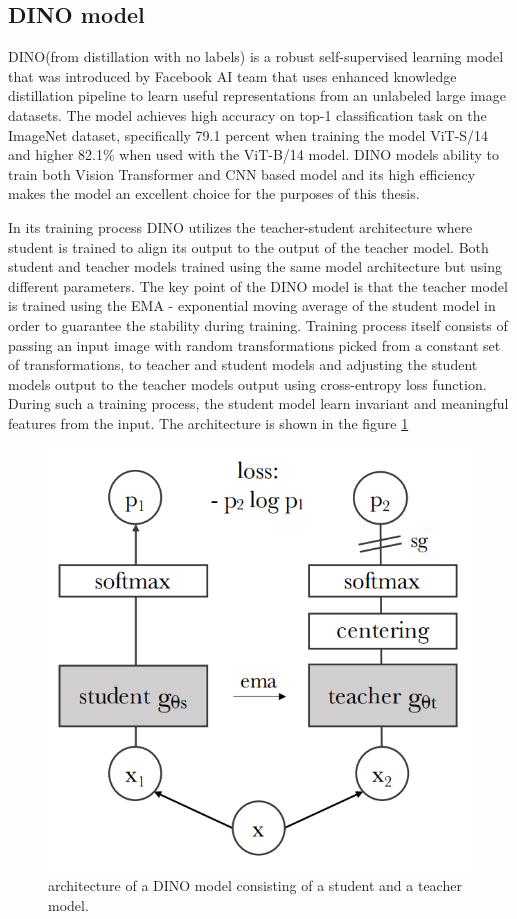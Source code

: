 \subsection{DINO model}
\label{dino}
DINO(from distillation with no labels) is a robust self-supervised learning model that was introduced by Facebook AI team that uses enhanced knowledge distillation pipeline to learn useful representations from an unlabeled large image datasets\cite{dino}. The model achieves high accuracy on top-1 classification task on the ImageNet dataset, specifically 79.1 percent when training the model ViT-S/14 and higher 82.1\% when used with the ViT-B/14 model\cite{dino}. DINO models ability to train both Vision Transformer and CNN based model and its high efficiency makes the model an excellent choice for the purposes of this thesis.

In its training process DINO utilizes the teacher-student architecture where student is trained to align its output to the output of the teacher model\cite{dino}. Both student and teacher models trained using the same model architecture but using different parameters. The key point of the DINO model is that the teacher model is trained using the EMA - exponential moving average of the student model in order to guarantee the stability during training\cite{dion}. Training process itself consists of passing an input image with random transformations picked from a constant set of transformations, to teacher and student models and adjusting the student models output to the teacher models output using cross-entropy loss function. During such a training process, the student model learn invariant and meaningful features from the input\cite{dino}. The architecture is shown in the figure \ref{fig:dino}

\begin{figure}[t]
	\begin{center}
		\includegraphics[width=0.5\linewidth]{Chapter_2/dino.png}
	\end{center}
	\caption{architecture of a DINO model consisting of a student and a teacher model.\cite{dino}}
	\label{fig:dino}
\end{figure}

